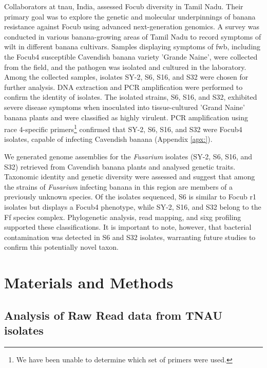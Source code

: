 Collaborators at \ac{tnau}, India, assessed \ac{Focub} diversity in Tamil Nadu. Their primary goal was to explore the genetic and molecular underpinnings of banana resistance against \ac{Focub} using advanced next-generation genomics. A survey was conducted in various banana-growing areas of Tamil Nadu to record symptoms of wilt in different banana cultivars. Samples displaying symptoms of \ac{fwb}, including the \ac{Focub4} susceptible Cavendish banana variety 'Grande Naine', were collected from the field, and the pathogen was isolated and cultured in the laboratory. Among the collected samples, isolates SY-2, S6, S16, and S32 were chosen for further analysis. DNA extraction and PCR amplification were performed to confirm the identity of isolates. The isolated strains, S6, S16, and S32, exhibited severe disease symptoms when inoculated into tissue-cultured 'Grand Naine' banana plants and were classified as highly virulent. PCR amplification using race 4-specific primers\footnote{We have been unable to determine which set of primers were used.} confirmed that SY-2, S6, S16, and S32 were \ac{Focub4} isolates, capable of infecting Cavendish banana (Appendix \ref{apx:}).

\vbox{
We generated genome assemblies for the \textit{Fusarium} isolates  (SY-2, S6, S16, and S32) retrieved from Cavendish banana plants and analysed genetic traits. Taxonomic identity and genetic diversity were assessed and suggest that among the strains of \textit{Fusarium} infecting banana in this region are members of a previously unknown species. Of the isolates sequenced, S6 is similar to \ac{Focub} \ac{r1} isolates but displays a \ac{Focub4} phenotype, while SY-2, S16, and S32 belong to the \acf{Ff} species complex. Phylogenetic analysis, read mapping, and \ac{sixg} profiling supported these classifications. It is important to note, however, that bacterial contamination was detected in S6 and S32 isolates, warranting future studies to confirm this potentially novel taxon.}

\newpage
\section{Materials and Methods}

\subsection{Analysis of Raw Read data from TNAU isolates}

